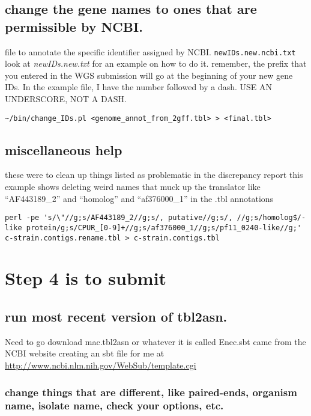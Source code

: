 \documentclass[11pt]{article}
\begin{document}
\subsection*{change the gene names to ones that are permissible by NCBI.}
\label{sec-3.6}

file to annotate the specific identifier assigned by NCBI. \texttt{newIDs.new.ncbi.txt}
look at \emph{newIDs.new.txt} for an example on how to do it. remember, the prefix that 
you entered in the WGS submission will go at the beginning of your new gene IDs. In the 
example file, I have the number followed by a dash. USE AN UNDERSCORE, NOT A DASH.

\begin{verbatim}
~/bin/change_IDs.pl <genome_annot_from_2gff.tbl> > <final.tbl>
\end{verbatim}



\subsection*{miscellaneous help}
\label{sec-3.7}

these were to clean up things listed as problematic in the discrepancy report
this example shows deleting weird names that muck up the translator like ``AF443189\_{}2'' and ``homolog'' and ``af376000\_{}1''
in the .tbl annotations


\begin{verbatim}
perl -pe 's/\"//g;s/AF443189_2//g;s/, putative//g;s/, //g;s/homolog$/-like protein/g;s/CPUR_[0-9]+//g;s/af376000_1//g;s/pf11_0240-like//g;' c-strain.contigs.rename.tbl > c-strain.contigs.tbl
\end{verbatim}



\section*{Step 4 is to submit}
\label{sec-4}

\subsection*{run most recent version of tbl2asn.}
\label{sec-4.1}

Need to go download mac.tbl2asn or whatever it is called
Enec.sbt came from the NCBI website creating an sbt file for me at
\href{http://www.ncbi.nlm.nih.gov/WebSub/template.cgi}{http://www.ncbi.nlm.nih.gov/WebSub/template.cgi}
\subsubsection*{change things that are different, like paired-ends, organism name, isolate name, check your options, etc.}
\label{sec-4.1.1}
\end{document}
